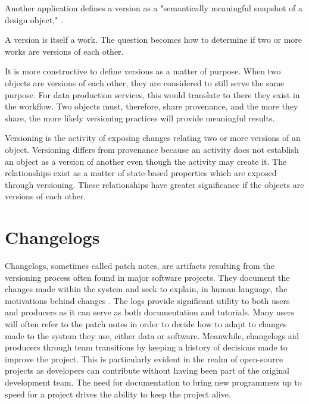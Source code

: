 Another application defines a version as a "semantically meaningful snapshot of a design object," \cite{Tagger2005}.  

A version is itself a work.
The question becomes how to determine if two or more works are versions of each other.

It is more constructive to define versions as a matter of purpose.  When two objects are versions of each other, they are considered to still serve the same purpose.  For data production services, this would translate to there they exist in the workflow. Two objects must, therefore, share provenance, and the more they share, the more likely versioning practices will provide meaningful results.

Versioning is the activity of exposing changes relating two or more versions of an object.  Versioning differs from provenance because an activity does not establish an object as a version of another even though the activity may create it.  The relationships exist as a matter of state-based properties which are exposed through versioning.  These relationships have greater significance if the objects are versions of each other.

\section{Changelogs}

Changelogs, sometimes called patch notes, are artifacts resulting from the versioning process often found in major software projects.
They document the changes made within the system and seek to explain, in human language, the motivations behind changes \cite{uel1037}.
The logs provide significant utility to both users and producers as it can serve as both documentation and tutorials.
Many users will often refer to the patch notes in order to decide how to adapt to changes made to the system they use, either data or software.
Meanwhile, changelogs aid producers through team transitions by keeping a history of decisions made to improve the project.
This is particularly evident in the realm of open-source projects as developers can contribute without having been part of the original development team.
The need for documentation to bring new programmers up to speed for a project drives the ability to keep the project alive.

